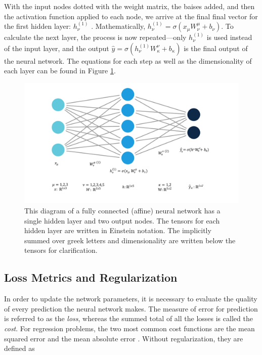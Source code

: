 With the input nodes dotted with the weight matrix, the baises added, and then the activation function applied to each node, we arrive at the final final vector for the first hidden layer: $ h_\nu^{(1)} $ . Mathematically, $ h_\nu^{(1)} = \sigma\left( x_\mu W_\nu ^\mu + b_\nu \right) $. To calculate the next layer, the process is now repeated---only $ h_\nu^{(1)} $ is used instead of the input layer, and the output
$ \hat{y} = \sigma \left( h_\nu^{(1)} W_\kappa ^\nu + b_\kappa \right)$ is the final output of the neural network. The equations for each step as well as the dimensionality of each layer can be found in Figure \ref{fig:simpleNN}.

\begin{figure}[h!]
    \centering
    \includegraphics[width=\linewidth]{Chapters/Figures/einstein_NN_2.pdf}
    \caption[Neural Network Example]{This diagram of a fully connected (affine) neural network has a single hidden layer and two output nodes. The tensors for each hidden layer are written in Einstein notation. The implicitly summed over greek letters and dimensionality are written below the tensors for clarification.}
    \label{fig:simpleNN}
\end{figure}

\subsection{Loss Metrics and Regularization}
In order to update the network parameters, it is necessary to evaluate the quality of every prediction the neural network makes. The measure of error for prediction is referred to as the \textit{loss}, whereas the summed total of all the losses is called the \textit{cost}. For regression problems, the two most common cost functions are the mean squared error and the mean absolute error \cite{regularization-2017survey}. Without regularization, they are defined as

